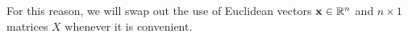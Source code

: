 \begin{applicationActivities}
\begin{observation}
For this reason, we will swap out the use of Euclidean vectors
\(\mathbf x\in\mathbb{R}^n\) and \(n\times 1\) matrices \(X\) whenever it is
convenient.
\end{observation}

\end{applicationActivities}
